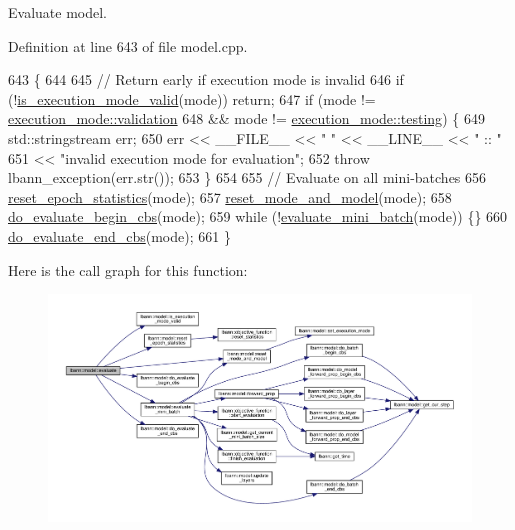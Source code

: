 Evaluate model. 

Definition at line 643 of file model.\+cpp.


\begin{DoxyCode}
643                                         \{
644 
645   \textcolor{comment}{// Return early if execution mode is invalid}
646   \textcolor{keywordflow}{if} (!\hyperlink{classlbann_1_1model_a2c82c9def03b1c60e48f52fca7708833}{is\_execution\_mode\_valid}(mode)) \textcolor{keywordflow}{return};
647   \textcolor{keywordflow}{if} (mode != \hyperlink{base_8hpp_a2781a159088df64ed7d47cc91c4dc0a8aa617908b172c473cb8e8cda059e55bf0}{execution\_mode::validation}
648       && mode != \hyperlink{base_8hpp_a2781a159088df64ed7d47cc91c4dc0a8aae2b1fca515949e5d54fb22b8ed95575}{execution\_mode::testing}) \{
649     std::stringstream err;
650     err << \_\_FILE\_\_ << \textcolor{stringliteral}{" "} << \_\_LINE\_\_ << \textcolor{stringliteral}{" :: "}
651         << \textcolor{stringliteral}{"invalid execution mode for evaluation"};
652     \textcolor{keywordflow}{throw} lbann\_exception(err.str());
653   \}
654 
655   \textcolor{comment}{// Evaluate on all mini-batches}
656   \hyperlink{classlbann_1_1model_a9c6e9c199ca0ae06b8cf7266971ab9c3}{reset\_epoch\_statistics}(mode);
657   \hyperlink{classlbann_1_1model_a5d188d75f53e0a4c6161500181b27c03}{reset\_mode\_and\_model}(mode);
658   \hyperlink{classlbann_1_1model_ab14bedea05bd5ef549d95ceb2b57b7a4}{do\_evaluate\_begin\_cbs}(mode);
659   \textcolor{keywordflow}{while} (!\hyperlink{classlbann_1_1model_a9716a956bdc7d20dbc8ce8bf08bbcea7}{evaluate\_mini\_batch}(mode)) \{\}
660   \hyperlink{classlbann_1_1model_ab123ed691fb6e9f52d468914a1f4460c}{do\_evaluate\_end\_cbs}(mode);
661 \}
\end{DoxyCode}
Here is the call graph for this function\+:\nopagebreak
\begin{figure}[H]
\begin{center}
\leavevmode
\includegraphics[width=350pt]{classlbann_1_1model_a4191097fdbcd1686525e9cd150f958ef_cgraph}
\end{center}
\end{figure}
